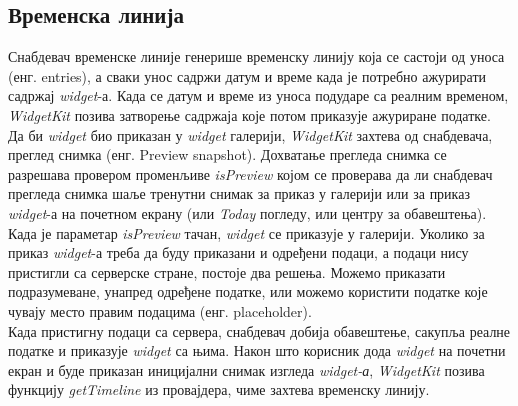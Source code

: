 \documentclass[12pt,oneside]{memoir}
\begin{document}
\subsection{Временска линија}
\label{subsec:Временска линија}
\indent Снабдевач временске линије генерише временску линију која се састоји од уноса (енг. entries), а сваки унос садржи датум и време када је потребно ажурирати садржај \textit{widget}-а. Када се датум и време из уноса подударе са реалним временом, \textit{WidgetKit} позива затворење садржаја које потом приказује ажуриране податке. 
\\
\indent Да би \textit{widget} био приказан у \textit{widget} галерији, \textit{WidgetKit} захтева од снабдевача, преглед снимка (енг. Preview snapshot). Дохватање прегледа снимка се разрешава провером променљиве \textit{isPreview} којом се проверава да ли снабдевач прегледа снимка шаље тренутни снимак за приказ у галерији или за приказ \textit{widget}-а на почетном екрану (или \textit{Today} погледу, или центру за обавештења). Када је параметар \textit{isPreview} тачан, \textit{widget} се приказује у галерији. Уколико за приказ \textit{widget}-а треба да буду приказани и одређени подаци, а подаци нису пристигли са серверске стране, постоје два решења. Можемо приказати подразумеване, унапред одређене податке, или можемо користити податке које чувају место правим подацима (енг. placeholder). 
\\
\indent Када пристигну подаци са сервера, снабдевач добија обавештење, сакупља реалне податке и приказује \textit{widget} са њима. Након што корисник дода \textit{widget} на почетни екран и буде приказан иницијални снимак изгледа \textit{widget-а}, \textit{WidgetKit} позива функцију \textit{getTimeline} из провајдера, чиме захтева временску линију.
\end{document}
